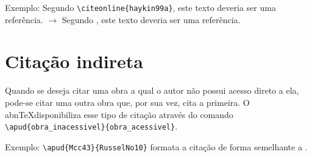     Exemplo: Segundo \verb+\citeonline{haykin99a}+, este texto deveria ser uma referência. $\to$ Segundo , este texto deveria ser uma referência.
	
	\section{Citação indireta}
	Quando se deseja citar uma obra a qual o autor não possui acesso direto a ela, pode-se citar uma outra obra que, por sua vez, cita a primeira. O abn\TeX disponibiliza esse tipo de citação através do comando \verb+\apud{obra_inacessivel}{obra_acessivel}+.
	
	Exemplo: \verb++ formata a citação de forma semelhante a \apud{Mcc43}{RusselNo10}.